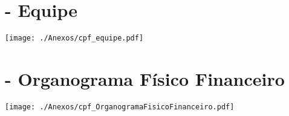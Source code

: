 \newpage
\section{- Equipe} \label{Anexo_equipe}
		\texttt{[image: ./Anexos/cpf\_equipe.pdf]}
		
\newpage
{}
\section{- Organograma Físico Financeiro} \label{Anexo_4_Organograma}
		\texttt{[image: ./Anexos/cpf\_OrganogramaFisicoFinanceiro.pdf]}
\restoregeometry
		
\newpage
\listoftodos 


